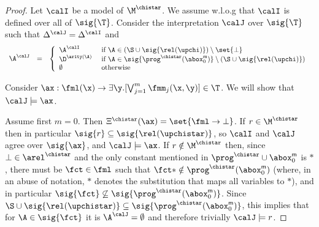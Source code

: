 \datalogSemModules*
\begin{proof}
Let $\calI$ be a model of $\M^{\chistar}$. We assume w.l.o.g that $\calI$ is defined over all of $\sig{\T}$. 
Consider the interpretation $\calJ$ over $\sig{\T}$ such that  $\Delta^{\calJ} = \Delta^{\calI}$ and 
\[\begin{array}{rcl}
 \A^{\calJ} & = & 
\left\lbrace\begin{array}{lll}
\A^{\calI} &  \text{ if } \A\in(\S\cup\sig{ 
\rel(\upchi)})\setminus \set{\bot}\\
\D^{\arity(\A)} & \text{ if } \A\in\sig{\prog^{\chistar}(\abox_0^{\mathsf{m}})}\setminus (\S\cup\sig{\rel(\upchi)})\\
\emptyset & \text{ otherwise}
\end{array}
\right.
\end{array}\]

Consider $\ax : \fml(\x) \to \exists \y. [\bigvee_{j=1}^m  \fmm_j(\x,\y)] \in \T$.
We will show that $\calJ\models \ax$.

Assume first $m=0$. Then $\Xi^{\chistar}(\ax) =\set{ \fml \to \bot}$.
If $r\in\M^{\chistar}$ then in particular $\sig{r}\subseteq \sig{\rel(\upchistar)}$, 
so $\calI$ and $\calJ$ agree over $\sig{\ax}$, and $\calJ\models \ax$.
If $r\notin\M^{\chistar}$ then, since $\bot\in\arel^{\chistar}$ and the only constant mentioned 
in $\prog^{\chistar}\cup\abox_0^{\mathsf{m}}$ is $*$, there must be $\fct\in\fml$ such that 
$\fct*\notin \prog^{\chistar}(\abox_0^{\mathsf{m}})$
(where, in an abuse of 
notation, $*$ denotes the substitution that maps all variables to $*$), and in particular 
$\sig{\fct}\not\subseteq \sig{\prog^{\chistar}(\abox_0^{\mathsf{m}})}$.
Since $\S\cup\sig{\rel(\upchistar)}\subseteq \sig{\prog^{\chistar}(\abox_0^{\mathsf{m}})}$,
this implies that for $\A\in\sig{\fct}$ it is $\A^{\calJ} = \emptyset$ and therefore
trivially $\calJ\models r$.


\end{proof}
